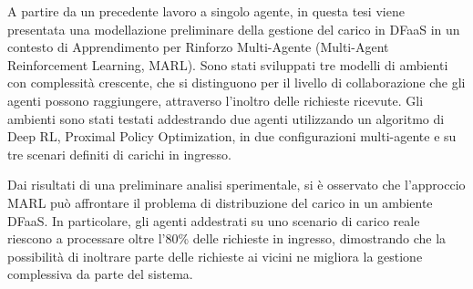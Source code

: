 A partire da un precedente lavoro a singolo agente, in questa tesi viene presentata una modellazione preliminare della gestione del carico in DFaaS in un contesto di Apprendimento per Rinforzo Multi-Agente (Multi-Agent Reinforcement Learning, MARL). Sono stati sviluppati tre modelli di ambienti con complessità crescente, che si distinguono per il livello di collaborazione che gli agenti possono raggiungere, attraverso l'inoltro delle richieste ricevute. Gli ambienti sono stati testati addestrando due agenti utilizzando un algoritmo di Deep RL, Proximal Policy Optimization, in due configurazioni multi-agente e su tre scenari definiti di carichi in ingresso.

Dai risultati di una preliminare analisi sperimentale, si è osservato che l'approccio MARL può affrontare il problema di distribuzione del carico in un ambiente DFaaS. In particolare, gli agenti addestrati su uno scenario di carico reale riescono a processare oltre l'80\% delle richieste in ingresso, dimostrando che la possibilità di inoltrare parte delle richieste ai vicini ne migliora la gestione complessiva da parte del sistema.

\cleardoublepage


\cleardoublepage

\tableofcontents
